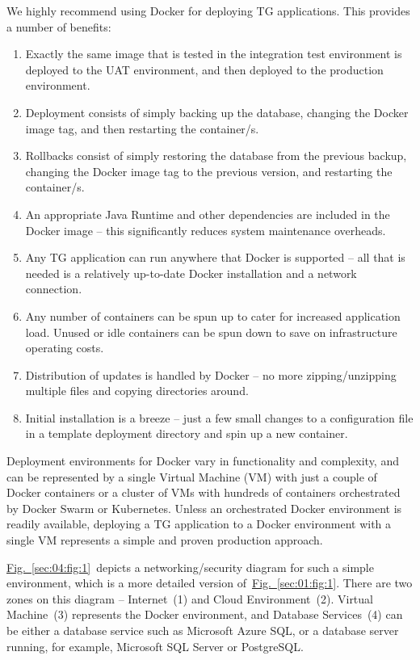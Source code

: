 \documentclass[a4paper,12pt,oneside,openright]{memoir}
\begin{document}
	We highly recommend using Docker for deploying TG applications.
	This provides a number of benefits:
\begin{enumerate}
	\item Exactly the same image that is tested in the integration test environment is deployed to the UAT environment, and then deployed to the production environment.
	\item Deployment consists of simply backing up the database, changing the Docker image tag, and then restarting the container/s.
	\item Rollbacks consist of simply restoring the database from the previous backup, changing the Docker image tag to the previous version, and restarting the container/s.
	\item An appropriate Java Runtime and other dependencies are included in the Docker image -- this significantly reduces system maintenance overheads.
	\item Any TG application can run anywhere that Docker is supported -- all that is needed is a relatively up-to-date Docker installation and a network connection.
	\item Any number of containers can be spun up to cater for increased application load.
	      Unused or idle containers can be spun down to save on infrastructure operating costs.
	\item Distribution of updates is handled by Docker -- no more zipping/unzipping multiple files and copying directories around.
	\item Initial installation is a breeze -- just a few small changes to a configuration file in a template deployment directory and spin up a new container.
\end{enumerate}

	Deployment environments for Docker vary in functionality and complexity, and can be represented by a single Virtual Machine (VM) with just a couple of Docker containers or a cluster of VMs with hundreds of containers orchestrated by Docker Swarm or Kubernetes.
	Unless an orchestrated Docker environment is readily available, deploying a TG application to a Docker environment with a single VM represents a simple and proven production approach.

	\hyperref[sec:04:fig:1]{Fig.~\ref*{sec:04:fig:1}}~depicts a networking/security diagram for such a simple environment, which is a more detailed version of~\hyperref[sec:01:fig:1]{Fig.~\ref*{sec:01:fig:1}}.
	There are two zones on this diagram -- Internet~(1) and Cloud Environment~(2).
	Virtual Machine~(3) represents the Docker environment, and Database Services~(4) can be either a database service such as Microsoft Azure SQL, or a database server running, for example, Microsoft SQL Server or PostgreSQL.
\end{document}
